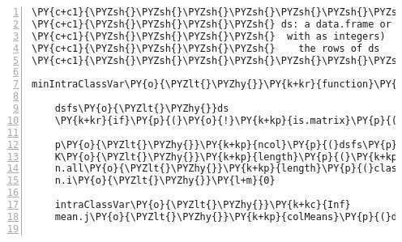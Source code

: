 \begin{Verbatim}[commandchars=\\\{\},codes={\catcode`\$=3\catcode`\^=7\catcode`\_=8},gobble=0,numbers=left,fontfamily=fvm,fontshape=n,fontsize=\footnotesize,tabsize=2]
\PY{c+c1}{\PYZsh{}\PYZsh{}\PYZsh{}\PYZsh{}\PYZsh{}\PYZsh{}\PYZsh{}\PYZsh{}\PYZsh{}\PYZsh{}\PYZsh{}\PYZsh{}\PYZsh{}\PYZsh{}\PYZsh{}\PYZsh{}\PYZsh{}\PYZsh{}\PYZsh{}\PYZsh{}\PYZsh{}\PYZsh{}\PYZsh{}\PYZsh{}\PYZsh{}\PYZsh{}\PYZsh{}\PYZsh{}\PYZsh{}\PYZsh{}\PYZsh{}\PYZsh{}\PYZsh{}\PYZsh{}\PYZsh{}\PYZsh{}\PYZsh{}\PYZsh{}\PYZsh{}\PYZsh{}\PYZsh{}\PYZsh{}\PYZsh{}\PYZsh{}\PYZsh{}\PYZsh{}\PYZsh{}\PYZsh{}\PYZsh{}\PYZsh{}\PYZsh{}\PYZsh{}\PYZsh{}\PYZsh{}\PYZsh{}\PYZsh{}\PYZsh{}\PYZsh{}\PYZsh{}\PYZsh{}\PYZsh{}\PYZsh{}\PYZsh{}\PYZsh{}\PYZsh{}\PYZsh{}\PYZsh{}\PYZsh{}\PYZsh{}\PYZsh{}\PYZsh{}\PYZsh{}\PYZsh{}\PYZsh{}\PYZsh{}}
\PY{c+c1}{\PYZsh{}\PYZsh{}\PYZsh{}\PYZsh{} ds: a data.frame or matrix (numeric values only/factors will be dealt }
\PY{c+c1}{\PYZsh{}\PYZsh{}\PYZsh{}\PYZsh{}	with as integers)  class vec: a vector correspong to the class of }
\PY{c+c1}{\PYZsh{}\PYZsh{}\PYZsh{}\PYZsh{}    the rows of ds           }
\PY{c+c1}{\PYZsh{}\PYZsh{}\PYZsh{}\PYZsh{}\PYZsh{}\PYZsh{}\PYZsh{}\PYZsh{}\PYZsh{}\PYZsh{}\PYZsh{}\PYZsh{}\PYZsh{}\PYZsh{}\PYZsh{}\PYZsh{}\PYZsh{}\PYZsh{}\PYZsh{}\PYZsh{}\PYZsh{}\PYZsh{}\PYZsh{}\PYZsh{}\PYZsh{}\PYZsh{}\PYZsh{}\PYZsh{}\PYZsh{}\PYZsh{}\PYZsh{}\PYZsh{}\PYZsh{}\PYZsh{}\PYZsh{}\PYZsh{}\PYZsh{}\PYZsh{}\PYZsh{}\PYZsh{}\PYZsh{}\PYZsh{}\PYZsh{}\PYZsh{}\PYZsh{}\PYZsh{}\PYZsh{}\PYZsh{}\PYZsh{}\PYZsh{}\PYZsh{}\PYZsh{}\PYZsh{}\PYZsh{}\PYZsh{}\PYZsh{}\PYZsh{}\PYZsh{}\PYZsh{}\PYZsh{}\PYZsh{}\PYZsh{}\PYZsh{}\PYZsh{}\PYZsh{}\PYZsh{}\PYZsh{}\PYZsh{}\PYZsh{}\PYZsh{}\PYZsh{}\PYZsh{}\PYZsh{}\PYZsh{}\PYZsh{}}

minIntraClassVar\PY{o}{\PYZlt{}\PYZhy{}}\PY{k+kr}{function}\PY{p}{(}ds\PY{p}{,}class.vec\PY{p}{)}\PY{p}{\PYZob{}}

	dsfs\PY{o}{\PYZlt{}\PYZhy{}}ds
	\PY{k+kr}{if}\PY{p}{(}\PY{o}{!}\PY{k+kp}{is.matrix}\PY{p}{(}dsfs\PY{p}{)}\PY{p}{)} dsfs\PY{o}{\PYZlt{}\PYZhy{}}\PY{k+kp}{data.matrix}\PY{p}{(}dsfs\PY{p}{)}  
	
	p\PY{o}{\PYZlt{}\PYZhy{}}\PY{k+kp}{ncol}\PY{p}{(}dsfs\PY{p}{)}
	K\PY{o}{\PYZlt{}\PYZhy{}}\PY{k+kp}{length}\PY{p}{(}\PY{k+kp}{levels}\PY{p}{(}class.vec\PY{p}{)}\PY{p}{)}
	n.all\PY{o}{\PYZlt{}\PYZhy{}}\PY{k+kp}{length}\PY{p}{(}class.vec\PY{p}{)}
	n.i\PY{o}{\PYZlt{}\PYZhy{}}\PY{l+m}{0}
	
	intraClassVar\PY{o}{\PYZlt{}\PYZhy{}}\PY{k+kc}{Inf}
	mean.j\PY{o}{\PYZlt{}\PYZhy{}}\PY{k+kp}{colMeans}\PY{p}{(}dsfs\PY{p}{)}
	

\end{Verbatim}
